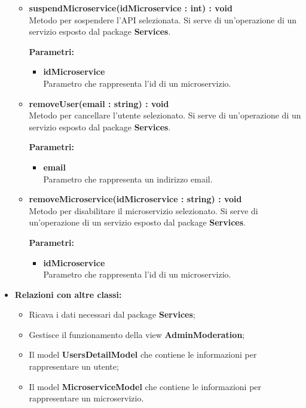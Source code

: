 \begin{itemize}
\begin{itemize}
			\item \textbf{suspendMicroservice(idMicroservice : int) : void}\\
			Metodo per sospendere l'API selezionata. Si serve di un'operazione di un servizio esposto dal package \textbf{Services}.
			\begin{description}
    			\item[\textbf{Parametri:}]
			\end{description}
			\begin{itemize}
				\item \textbf{idMicroservice}\\
				Parametro che rappresenta l'id di un microservizio.
			\end{itemize}
			
			\item \textbf{removeUser(email : string) : void}\\
			Metodo per cancellare l'utente selezionato. Si serve di un'operazione di un servizio esposto dal package \textbf{Services}.
			\begin{description}
    			\item[\textbf{Parametri:}]
			\end{description}
			\begin{itemize}
				\item \textbf{email}\\
				Parametro che rappresenta un indirizzo email.
			\end{itemize}
			
			\item \textbf{removeMicroservice(idMicroservice : string) : void}\\
			Metodo per disabilitare il microservizio selezionato. Si serve di un'operazione di un servizio esposto dal package \textbf{Services}.
			\begin{description}
    			\item[\textbf{Parametri:}]
			\end{description}
			\begin{itemize}
				\item \textbf{idMicroservice}\\
				Parametro che rappresenta l'id di un microservizio.
			\end{itemize}
			
		\end{itemize}
	\item \textbf{Relazioni con altre classi:}
		\begin{itemize}
			\item Ricava i dati necessari dal package \textbf{Services};
			\item Gestisce il funzionamento della view \textbf{AdminModeration};
			\item Il model \textbf{UsersDetailModel} che contiene le informazioni per rappresentare un utente;
			\item Il model \textbf{MicroserviceModel} che contiene le informazioni per rappresentare un microservizio.
	\end{itemize}
\end{itemize}

